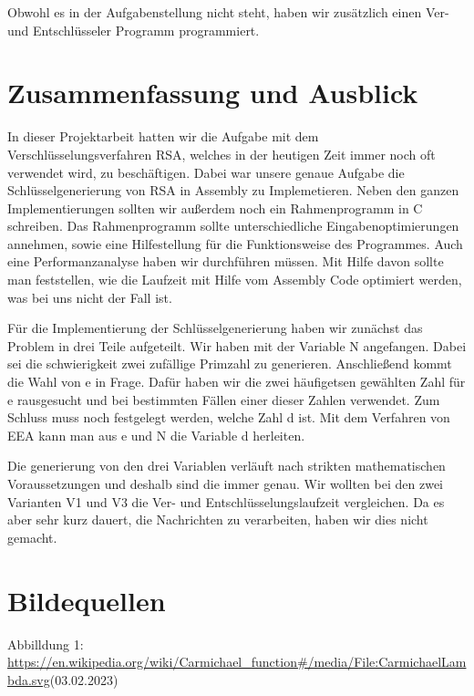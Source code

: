 \documentclass[course=asp]{aspdoc}
\begin{document}
Obwohl es in der Aufgabenstellung nicht steht, haben wir zusätzlich einen Ver- und Entschlüsseler Programm programmiert. 


\section{Zusammenfassung und Ausblick}
In dieser Projektarbeit hatten wir die Aufgabe mit dem Verschlüsselungsverfahren RSA, welches in der heutigen Zeit immer noch oft verwendet wird, zu beschäftigen. Dabei war unsere genaue Aufgabe die Schlüsselgenerierung von RSA in Assembly zu Implemetieren. Neben den ganzen Implementierungen sollten wir außerdem noch ein Rahmenprogramm in C schreiben. Das Rahmenprogramm sollte unterschiedliche Eingabenoptimierungen annehmen, sowie eine Hilfestellung für die Funktionsweise des Programmes. Auch eine Performanzanalyse haben wir durchführen müssen. Mit Hilfe davon sollte man feststellen, wie die Laufzeit mit Hilfe vom Assembly Code optimiert werden, was bei uns nicht der Fall ist. 

Für die Implementierung der Schlüsselgenerierung haben wir zunächst das Problem in drei Teile aufgeteilt. Wir haben mit der Variable N angefangen. Dabei sei die schwierigkeit zwei zufällige Primzahl zu generieren. Anschließend kommt die Wahl von e in Frage. Dafür haben wir die zwei häufigetsen gewählten Zahl für e rausgesucht und bei bestimmten Fällen einer dieser Zahlen verwendet. Zum Schluss muss noch festgelegt werden, welche Zahl d ist. Mit dem Verfahren von EEA kann man aus e und N die Variable d herleiten. 

Die generierung von den drei Variablen verläuft nach strikten mathematischen Voraussetzungen und deshalb sind die immer genau. Wir wollten bei den zwei Varianten V1 und V3 die Ver- und Entschlüsselungslaufzeit vergleichen. Da es aber sehr kurz dauert, die Nachrichten zu verarbeiten, haben wir dies nicht gemacht.

\section{Bildequellen}
Abbilldung 1: \url{https://en.wikipedia.org/wiki/Carmichael_function#/media/File:CarmichaelLambda.svg}(03.02.2023)


{}
\end{document}
